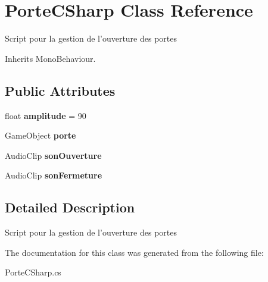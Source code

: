 \hypertarget{class_porte_c_sharp}{\section{Porte\+C\+Sharp Class Reference}
\label{class_porte_c_sharp}
}


Script pour la gestion de l'ouverture des portes  




Inherits Mono\+Behaviour.

\subsection*{Public Attributes}
\begin{DoxyCompactItemize}
\item 
\hypertarget{class_porte_c_sharp_a1854925753ad21efdc3ca9828a8b03da}{float {\bfseries amplitude} = 90}\label{class_porte_c_sharp_a1854925753ad21efdc3ca9828a8b03da}

\item 
\hypertarget{class_porte_c_sharp_ae36853128733819eb6796c62ef8e2aca}{Game\+Object {\bfseries porte}}\label{class_porte_c_sharp_ae36853128733819eb6796c62ef8e2aca}

\item 
\hypertarget{class_porte_c_sharp_af0dd0637370ede967eb04efdd3f6268d}{Audio\+Clip {\bfseries son\+Ouverture}}\label{class_porte_c_sharp_af0dd0637370ede967eb04efdd3f6268d}

\item 
\hypertarget{class_porte_c_sharp_a4797f3bcca38a3b3310c52f75cd81cb2}{Audio\+Clip {\bfseries son\+Fermeture}}\label{class_porte_c_sharp_a4797f3bcca38a3b3310c52f75cd81cb2}

\end{DoxyCompactItemize}


\subsection{Detailed Description}
Script pour la gestion de l'ouverture des portes 



The documentation for this class was generated from the following file\+:\begin{DoxyCompactItemize}
\item 
Porte\+C\+Sharp.\+cs\end{DoxyCompactItemize}
